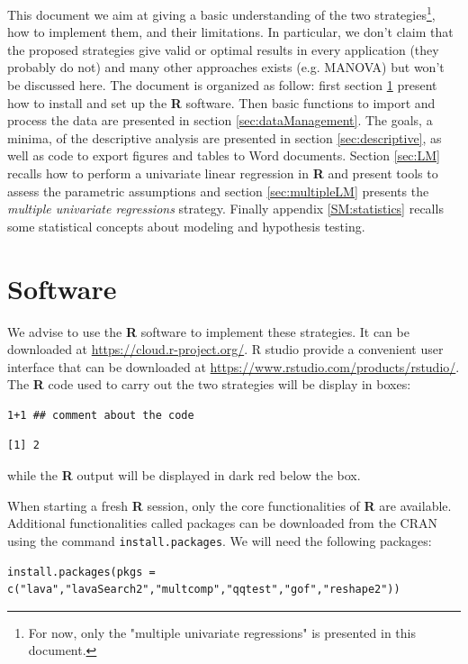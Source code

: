 \documentclass{article}
\newcommand\Rlogo{\textbf{\textsf{R}}}
\begin{document}
\bigskip

This document we aim at giving a basic understanding of the two
  strategies\footnote{For now, only the "multiple univariate regressions" is
presented in this document.}, how to implement them, and their limitations. In
  particular, we don't claim that the proposed strategies give valid
  or optimal results in every application (they probably do not) and
  many other approaches exists (e.g. MANOVA) but won't be discussed
  here. The document is organized as follow: first section
  \ref{sec:Rsoftware} present how to install and set up the \Rlogo{}
  software. Then basic functions to import and process the data are
  presented in section \ref{sec:dataManagement}. The goals, a minima, of
  the descriptive analysis are presented in section \ref{sec:descriptive},
  as well as code to export figures and tables to Word
  documents. Section \ref{sec:LM} recalls how to perform a univariate
  linear regression in \Rlogo{} and present tools to assess the
  parametric assumptions and section \ref{sec:multipleLM} presents the
  \emph{multiple univariate regressions} strategy. Finally appendix
  \ref{SM:statistics} recalls some statistical concepts about modeling and
  hypothesis testing.

\clearpage

\section{Software}
\label{sec:Rsoftware}
We advise to use the \Rlogo{} software to implement these strategies. It can
be downloaded at \url{https://cloud.r-project.org/}. R studio provide a
convenient user interface that can be downloaded at
\url{https://www.rstudio.com/products/rstudio/}.  The \Rlogo{} code used to carry
out the two strategies will be display in boxes:
\lstset{language=r,label= ,caption= ,captionpos=b,numbers=none}
\begin{lstlisting}
1+1 ## comment about the code
\end{lstlisting}

\begin{verbatim}
[1] 2
\end{verbatim}

while the \Rlogo{} output will be displayed in dark red below the box. 

\bigskip

When starting a fresh \Rlogo{} session, only the core functionalities of
\Rlogo{} are available. Additional functionalities called packages can
be downloaded from the CRAN using the command \texttt{install.packages}. We
will need the following packages:
\lstset{language=r,label= ,caption= ,captionpos=b,numbers=none}
\begin{lstlisting}
install.packages(pkgs = c("lava","lavaSearch2","multcomp","qqtest","gof","reshape2"))
\end{lstlisting}
\end{document}
